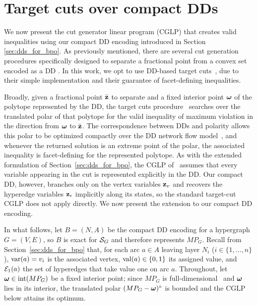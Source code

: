 \section{Target cuts over compact DDs}
\label{sec:dd_separation}

We now present the cut generator linear program (CGLP) that creates valid inequalities using our compact DD encoding introduced in Section \ref{sec:dds_for_bpo}. As previously mentioned, there are several cut generation procedures specifically designed to separate a fractional point from a convex set encoded as a DD \cite{beckerBehleEisenbrandWimmer2005,behle2007,castroCireBeck2022cutLift,davarniaVanHoeve2021outer}. In this work, we opt to use DD-based target cuts~\cite{tjandraatmadjaVanHoeve2019target}, due to their simple implementation and their guarantee of facet-defining inequalities.

Broadly, given a fractional point $\bar {\mathbf{z}}$ to separate and a fixed interior point $\bm{\omega}$ of the polytope represented by the DD, the target cuts procedure~\cite{buchheimLiersOswald2008localcuts} searches over the translated polar of that polytope for the valid inequality of maximum violation in the direction from $\bm{\omega}$ to $\bar {\mathbf{z}}$. The correspondence between DDs and polarity allows this polar to be optimized compactly over the DD network flow model~\cite{tjandraatmadjaVanHoeve2019target}, and whenever the returned solution is an extreme point of the polar, the associated inequality is facet-defining for the represented polytope. As with the extended formulation of Section~\ref{sec:dds_for_bpo}, the CGLP of~\cite{tjandraatmadjaVanHoeve2019target}  assumes that every variable appearing in the cut is represented explicitly in the DD. Our compact DD, however, branches only on the vertex variables $\mathbf{z}_v$ and recovers the hyperedge variables $\mathbf{z}_e$ implicitly along its states, so the standard target-cut CGLP does not apply directly. We now present the extension to our compact DD encoding.

In what follows, let $B=(N,A)$ be the compact DD encoding 
for a hypergraph $G=(V,E)$, so $B$ is exact for $\mathcal{S}_G$ and therefore represents $MP_G$. Recall from Section~\ref{sec:dds_for_bpo} that, for each arc $a\in A$ leaving layer $N_i$ ($i \in \{1,\ldots,n\}$), $\operatorname{var}(a)=v_i$ is the associated vertex, $\operatorname{val}(a)\in\{0,1\}$ its assigned value, and $\mathcal{E}_1(a)$ the set of hyperedges that take value one on arc $a$. Throughout, let $\bm{\omega}\in\operatorname{int}(MP_G)$ be a fixed interior point; since $MP_G$ is full-dimensional~\cite{del2017polyhedral} and $\bm{\omega}$ lies in its interior, the translated polar $(MP_G-\bm{\omega})^\circ$ is bounded and the CGLP below attains its optimum.

